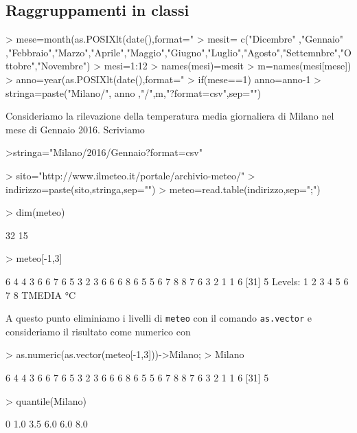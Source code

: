 \documentclass[onecolumn,12pt]{book}
\begin{document}
\subsection{Raggruppamenti in classi}
\begin{Schunk}
\begin{Sinput}
> mese=month(as.POSIXlt(date(),format="%
> mesit= c("Dicembre" ,"Gennaio" ,"Febbraio","Marzo","Aprile","Maggio","Giugno","Luglio","Agosto","Settemnbre","Ottobre","Novembre")
> mesi=1:12
> names(mesi)=mesit
> m=names(mesi[mese])
> anno=year(as.POSIXlt(date(),format="%
> if(mese==1) anno=anno-1
> stringa=paste("Milano/", anno ,"/",m,"?format=csv",sep="")
\end{Sinput}
\end{Schunk}
Consideriamo la rilevazione della temperatura media giornaliera di Milano nel mese di Gennaio 2016.
Scriviamo
\begin{Schunk}
\begin{Soutput}
>stringa="Milano/2016/Gennaio?format=csv"
\end{Soutput}
\end{Schunk}
\begin{Schunk}
\begin{Sinput}
> sito="http://www.ilmeteo.it/portale/archivio-meteo/"
> indirizzo=paste(sito,stringa,sep="")
> meteo=read.table(indirizzo,sep=";")
\end{Sinput}
\end{Schunk}
\begin{Schunk}
\begin{Sinput}
> dim(meteo)
\end{Sinput}
\begin{Soutput}
[1] 32 15
\end{Soutput}
\begin{Sinput}
> meteo[-1,3]
\end{Sinput}
\begin{Soutput}
 [1] 6 4 4 3 6 6 7 6 5 3 2 3 6 6 6 8 6 5 5 6 7 8 8 7 6 3 2 1 1 6
[31] 5
Levels: 1 2 3 4 5 6 7 8 TMEDIA °C
\end{Soutput}
\end{Schunk}
A questo punto eliminiamo i livelli di \texttt{meteo} con il comando \texttt{as.vector} e consideriamo il risultato come numerico con
\begin{Schunk}
\begin{Sinput}
> as.numeric(as.vector(meteo[-1,3]))->Milano;
> Milano
\end{Sinput}
\begin{Soutput}
 [1] 6 4 4 3 6 6 7 6 5 3 2 3 6 6 6 8 6 5 5 6 7 8 8 7 6 3 2 1 1 6
[31] 5
\end{Soutput}
\begin{Sinput}
> quantile(Milano)
\end{Sinput}
\begin{Soutput}
  0%
 1.0  3.5  6.0  6.0  8.0 
\end{Soutput}
\end{Schunk}
\end{document}
